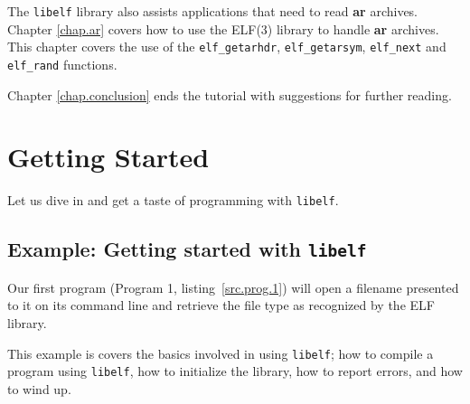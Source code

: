 \documentclass[a4paper,pdftex]{book}
\newcommand{\function}[1]{\texttt{#1}}
\newcommand{\library}[1]{\texttt{#1}}
\newcommand{\tool}[1]{\textbf{#1}}
\begin{document}
The \library{libelf} library also assists applications that need to
read \tool{ar} archives.  Chapter \vref{chap.ar} covers how to use the
ELF(3) library to handle \tool{ar} archives.  This chapter covers the
use of the \function{elf\_get\-arhdr}, \function{elf\_get\-arsym},
\function{elf\_next} and \function{elf\_rand} functions.

Chapter \vref{chap.conclusion} ends the tutorial with suggestions for
further reading.

\chapter{Getting Started}\label{chap.getting-started}

Let us dive in and get a taste of programming with \library{libelf}.

\section{Example: Getting started with \library{libelf}}

Our first program (Program 1, listing~\vref{src.prog.1}) will open a
filename presented to it on its command line and retrieve the file
type as recognized by the ELF library.

This example is covers the basics involved in using \library{libelf};
how to compile a program using \library{libelf}, how to initialize the
library, how to report errors, and how to wind up.
\end{document}
